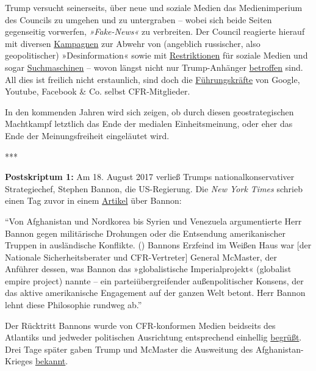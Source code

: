 Trump versucht seinerseits, über neue und soziale Medien das
Medienimperium des Councils zu umgehen und zu untergraben -- wobei sich
beide Seiten gegenseitig vorwerfen, \emph{»Fake-News«} zu verbreiten.
Der Council reagierte hierauf mit diversen
\href{http://www.npr.org/2017/05/10/527720078/nato-takes-aim-at-disinformation-campaigns}{Kampagnen}
zur Abwehr von (angeblich russischer, also geopolitischer)
»Desinformation« sowie mit
\href{https://www.heise.de/tp/features/Facebook-Fake-News-und-die-Privatisierung-der-Zensur-3599878.html}{Restriktionen}
für soziale Medien und sogar
\href{https://www.wsws.org/en/articles/2017/08/04/goog-a04.html}{Suchmaschinen}
-- wovon längst nicht nur Trump-Anhänger
\href{https://www.wsws.org/en/articles/2017/08/02/pers-a02.html}{betroffen}
sind. All dies ist freilich nicht erstaunlich, sind doch die
\href{https://swprs.org/das-american-empire-und-seine-medien/}{Führungskräfte}
von Google, Youtube, Facebook \& Co. selbst CFR-Mitglieder.

In den kommenden Jahren wird sich zeigen, ob durch diesen
geostrategischen Machtkampf letztlich das Ende der medialen
Einheitsmeinung, oder eher das Ende der Meinungsfreiheit eingeläutet
wird.

***

\textbf{Postskriptum 1:} Am 18. August 2017 verließ Trumps
nationalkonservativer Strategiechef, Stephen Bannon, die US-Regierung.
Die \emph{New York Times} schrieb einen Tag zuvor in einem
\href{https://www.nytimes.com/2017/08/17/us/politics/steve-bannon-nationalism-trump.html}{Artikel}
über Bannon:

``Von Afghanistan und Nordkorea bis Syrien und Venezuela argumentierte
Herr Bannon gegen militärische Drohungen oder die Entsendung
amerikanischer Truppen in ausländische Konflikte. () Ban­nons Erzfeind
im Weißen Haus war {[}der Nationale Sicherheitsberater und
CFR-Vertreter{]} General McMaster, der Anführer dessen, was Bannon das
»globalistische Imperialprojekt« (globalist empire project) nannte --
ein parteiübergreifender außenpolitischer Konsens, der das aktive
amerikanische Engagement auf der ganzen Welt betont. Herr Bannon lehnt
diese Philosophie rundweg ab.''

Der Rücktritt Bannons wurde von CFR-konformen Medien beidseits des
Atlantiks und jedweder politischen Ausrichtung entsprechend einhellig
\href{http://www.spiegel.de/politik/ausland/stephen-bannon-pressestimmen-zum-ruecktritt-a-1163595.html}{begrüßt}.
Drei Tage später gaben Trump und McMaster die Ausweitung des
Afghanistan-Krieges
\href{http://www.huffingtonpost.com/entry/hr-mccaster-donald-trump-afghanistan_us_599c6105e4b06a788a2c2026}{bekannt}.

